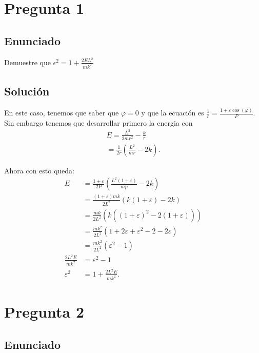 \documentclass[12pt]{article}
\begin{document}

\section*{Pregunta 1}

\subsection*{Enunciado}

Demuestre que $\epsilon^2=1+\frac{2EL^2}{mk^2}$

\subsection*{Solución}

En este caso, tenemos que saber que $\varphi = 0$ y que la ecuación es $\frac{1}{r}=\frac{1+\varepsilon\cos\left( \varphi \right) }{P}$. Sin embargo tenemos que desarrollar primero la energia con
\begin{align*}
  E = \frac{L^2}{2mr^2}- \frac{k}{r}\\
  =\frac{1}{2r}\left( \frac{L^2}{mr}- 2k \right) 
.\end{align*}

Ahora con esto queda:
\begin{align*}
  E &= \frac{1 + \varepsilon}{2P}\left( \frac{L^2\left( 1+\varepsilon \right) }{mp}-2k \right) \\
  &= \frac{\left( 1+\varepsilon \right)  mk}{2L^2}\left( k\left( 1 + \varepsilon \right)  - 2k \right)  \\
  &= \frac{mk}{2L^2}\left( k\left( \left( 1+\varepsilon \right)^2 - 2\left( 1 + \varepsilon \right)   \right)  \right)   \\
  &= \frac{mk^2}{2L^2}\left( 1 + 2\varepsilon + \varepsilon^2 - 2 - 2\varepsilon \right)  \\
  &= \frac{ mk^2}{2L^2}\left( \varepsilon^2-1 \right)  \\
  \frac{2L^2 E}{mk^2} &= \varepsilon^2 - 1 \\
  \varepsilon^2 &= 1 + \frac{2L^2 E}{mk^2}
.\end{align*}


\section*{Pregunta 2}

\subsection*{Enunciado}
\end{document}
